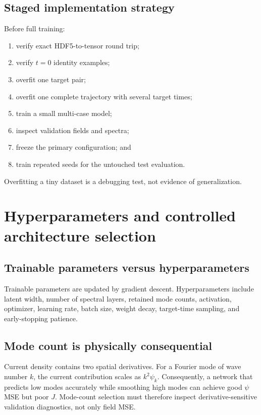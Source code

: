 \documentclass[11pt]{article}
\begin{document}
\subsection{Staged implementation strategy}
Before full training:
\begin{enumerate}
  \item verify exact HDF5-to-tensor round trip;
  \item verify $t=0$ identity examples;
  \item overfit one target pair;
  \item overfit one complete trajectory with several target times;
  \item train a small multi-case model;
  \item inspect validation fields and spectra;
  \item freeze the primary configuration; and
  \item train repeated seeds for the untouched test evaluation.
\end{enumerate}
Overfitting a tiny dataset is a debugging test, not evidence of generalization.

\section{Hyperparameters and controlled architecture selection}
\label{sec:hyperparameters}

\subsection{Trainable parameters versus hyperparameters}
Trainable parameters are updated by gradient descent. Hyperparameters include latent width, number of spectral layers, retained mode counts, activation, optimizer, learning rate, batch size, weight decay, target-time sampling, and early-stopping patience.

\subsection{Mode count is physically consequential}
Current density contains two spatial derivatives. For a Fourier mode of wave number $k$, the current contribution scales as $k^2\psi_k$. Consequently, a network that predicts low modes accurately while smoothing high modes can achieve good $\psi$ MSE but poor $J$. Mode-count selection must therefore inspect derivative-sensitive validation diagnostics, not only field MSE.
\end{document}
